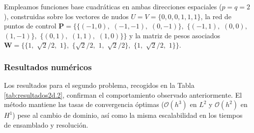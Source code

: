 \documentclass[11pt]{book}
\theoremstyle{plain} %
\theoremstyle{definition} %
\theoremstyle{definition} %
\begin{document}
Empleamos funciones base cuadráticas en ambas direcciones espaciales ($p = q = 2$), construidas sobre los vectores de nudos $U = V = \{0, 0, 0, 1, 1, 1\}$, la red de puntos de control $\mathbf{P} = \{ \{(-1,0),$ $(-1,-1),$ $(0,-1)\},$ $\{(-1,1),$ $(0,0),$ $(1,-1)\},$ $\{(0,1),$ $(1,1),$ $(1,0)\} \}$ y la matriz de pesos asociados $\mathbf{W} = \{ \{1,$ $\sqrt{2}/2,$ $1\},$ $\{\sqrt{2}/2,$ $1,$ $\sqrt{2}/2\},$ $\{1,$ $\sqrt{2}/2,$ $1\} \}$.

\vspace{-0.3cm}
\subsubsection{Resultados numéricos}
Los resultados para el segundo problema, recogidos en la Tabla \ref{tab:resultados2d.2}, confirman el comportamiento observado anteriormente. El método mantiene las tasas de convergencia óptimas ($\mathcal{O}(h^3)$ en $L^2$ y $\mathcal{O}(h^2)$ en $H^1$) pese al cambio de dominio, así como la misma escalabilidad en los tiempos de ensamblado y resolución.
    
\end{document}
